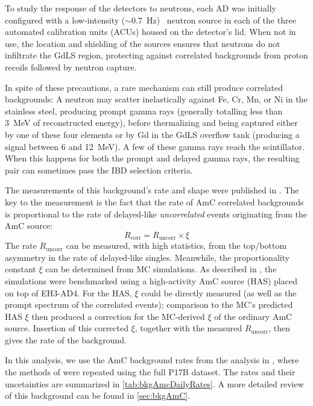 \documentclass[../thesis.tex]{subfiles}
\begin{document}
To study the response of the detectors to neutrons, each AD was initially configured with a low-intensity ($\sim$0.7~Hz) \AmC\ neutron source in each of the three automated calibration units (ACUs) housed on the detector's lid. When not in use, the location and shielding of the sources ensures that neutrons do not infiltrate the GdLS region, protecting against correlated backgrounds from proton recoils followed by neutron capture.

In spite of these precautions, a rare mechanism can still produce correlated backgrounds: A neutron may scatter inelastically against Fe, Cr, Mn, or Ni in the stainless steel, producing prompt gamma rays (generally totalling less than 3~MeV of reconstructed energy), before thermalizing and being captured either by one of these four elements or by Gd in the GdLS overflow tank (producing a signal between 6 and 12~MeV). A few of these gamma rays reach the scintillator. When this happens for both the prompt and delayed gamma rays, the resulting pair can sometimes pass the IBD selection criteria.

The measurements of this background's rate and shape were published in \cite{Gu_2016}. The key to the measurement is the fact that the rate of AmC correlated backgrounds is proportional to the rate of delayed-like \emph{uncorrelated} events originating from the AmC source:
\begin{equation}
  R_{\mathrm{corr}} = R_{\mathrm{uncorr}} \times \xi
  \label{eq:bkgAmcFundamentalOverview}
\end{equation}
The rate $R_{\mathrm{uncorr}}$ can be measured, with high statistics, from the top/bottom asymmetry in the rate of delayed-like singles. Meanwhile, the proportionality constant $\xi$ can be determined from MC simulations. As described in \cite{Gu_2016}, the simulations were benchmarked using a high-activity AmC source (HAS) placed on top of EH3-AD4. For the HAS, $\xi$ could be directly measured (as well as the prompt spectrum of the correlated events); comparison to the MC's predicted HAS $\xi$ then produced a correction for the MC-derived $\xi$ of the ordinary AmC source. Insertion of this corrected $\xi$, together with the measured $R_{\mathrm{uncorr}}$, then gives the rate of the background.

In this analysis, we use the AmC background rates from the analysis in \cite{lianghongBkg}, where the methods of \cite{Gu_2016} were repeated using the full P17B dataset. The rates and their uncetainties are summarized in \autoref{tab:bkgAmcDailyRates}. A more detailed review of this background can be found in \autoref{sec:bkgAmC}.
\end{document}
